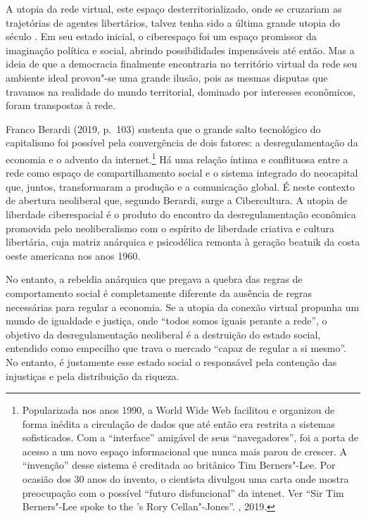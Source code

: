 A utopia da rede virtual, este espaço desterritorializado, onde se
cruzariam as trajetórias de agentes libertários, talvez tenha sido a
última grande utopia do século . Em seu estado inicial, o ciberespaço
foi um espaço promissor da imaginação política e social, abrindo
possibilidades impensáveis até então. Mas a ideia de que a democracia finalmente
encontraria no território virtual da rede seu ambiente ideal
provou"-se uma grande ilusão, pois as mesmas disputas que travamos na
realidade do mundo territorial, dominado por interesses econômicos,
foram transpostas à rede.

Franco Berardi (2019, p.~103) sustenta que o grande salto tecnológico do
capitalismo foi possível pela convergência de dois fatores: a
desregulamentação da economia e o advento da internet.\footnote{Popularizada
  nos anos 1990, a World Wide Web facilitou e organizou de forma inédita
  a circulação de dados que até então era restrita a sistemas
  sofisticados. Com a ``interface'' amigável de seus ``navegadores'',
  foi a porta de acesso a um novo espaço informacional que nunca mais
  parou de crescer. A ``invenção'' desse sistema é creditada ao
  britânico Tim Berners"-Lee. Por ocasião dos 30 anos do invento, o
  cientista divulgou uma carta onde mostra preocupação com o possível
  ``futuro disfuncional'' da intenet. Ver ``Sir Tim Berners"-Lee spoke to
  the 's Rory Cellan"-Jones''. , 2019.} Há uma relação íntima e
conflituosa entre a rede como espaço de compartilhamento social e o
sistema integrado do neocapital que, juntos, transformaram a produção e
a comunicação global. É neste contexto de abertura neoliberal que,
segundo Berardi, surge a Cibercultura. A utopia de liberdade
ciberespacial é o produto do encontro da desregulamentação econômica
promovida pelo neoliberalismo com o espírito de liberdade criativa e
cultura libertária, cuja matriz anárquica e psicodélica remonta à
geração beatnik da costa oeste americana nos anos 1960.

No entanto, a rebeldia anárquica que pregava a quebra das regras de
comportamento social é completamente diferente da ausência de regras
necessárias para regular a economia. Se a utopia da conexão virtual
propunha um mundo de igualdade e justiça, onde ``todos somos iguais
perante a rede'', o objetivo da desregulamentação neoliberal é a
destruição do estado social, entendido como empecilho que trava o
mercado ``capaz de regular a si mesmo''. No entanto, é justamente esse
estado social o responsável pela contenção das injustiças e pela
distribuição da riqueza.

